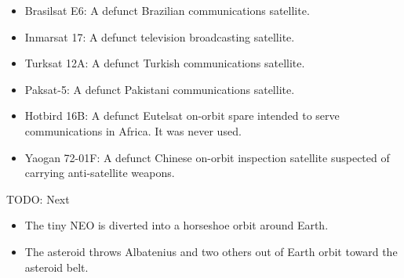 \begin{itemize}
\item Brasilsat E6: A defunct Brazilian communications satellite.
\item Inmarsat 17: A defunct television broadcasting satellite.
\item Turksat 12A: A defunct Turkish communications satellite.
\item Paksat-5: A defunct Pakistani communications satellite.
\item Hotbird 16B: A defunct Eutelsat on-orbit spare intended to serve communications in Africa. It was never used.
\item Yaogan 72-01F: A defunct Chinese on-orbit inspection satellite suspected of carrying anti-satellite weapons.
\end{itemize}



TODO: Next

\begin{itemize}
\item{The tiny NEO is diverted into a horseshoe orbit around Earth.}
\item{The asteroid throws Albatenius and two others out of Earth orbit toward the asteroid belt.}
\end{itemize}

\newpage
\thispagestyle{empty}